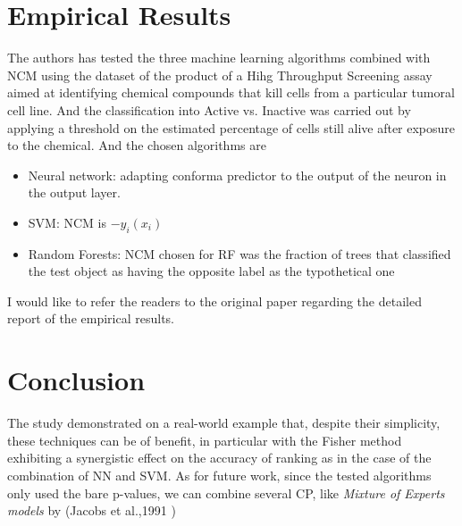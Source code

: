\documentclass[10pt,a4paper]{article}
\begin{document}
\section{Empirical Results}
The authors has tested the three machine learning algorithms combined with NCM using the dataset of the product of a Hihg Throughput Screening assay aimed at identifying chemical compounds that kill cells from a particular tumoral cell line. And the classification into Active vs. Inactive was carried out by applying a threshold on the estimated percentage of cells still alive after exposure to the chemical. And the chosen algorithms are 
\begin{itemize}
    \item Neural network: adapting conforma predictor to the output of the neuron in the output layer.
    \item SVM: NCM is $-y_i(x_i)$
    \item Random Forests: NCM chosen for RF was the fraction of trees that classified the test object as having the opposite label as the typothetical one
\end{itemize} I would like to refer the readers to the original paper regarding the detailed report of the empirical results.

\section{Conclusion}
 The study demonstrated on a real-world example that, despite their simplicity, these techniques can be of benefit, in particular with the Fisher method exhibiting a synergistic effect on the accuracy of ranking as in the case of the combination of NN and SVM. As for future work, since the tested algorithms only used the bare p-values, we can combine several CP, like \textit{Mixture of Experts models} by (Jacobs et al.,1991 \cite{jacobs1991adaptive})

\medskip
 
\printbibliography
\end{document}
